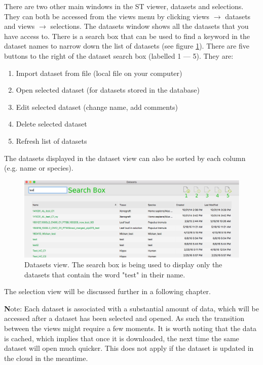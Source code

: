 \documentclass[10pt,a4paper,titlepage]{book}
\begin{document}
There are two other main windows in the ST viewer, datasets and selections. They can both be accessed from the views menu by clicking views $\rightarrow$ datasets and views $\rightarrow$ selections.
The datasets window shows all the datasets that you have access to. There is a search box that can be used to find a keyword in the dataset names to narrow down the list of datasets (see figure \ref{fig:datasets_view}). There are five buttons to the right of the dataset search box (labelled 1 --- 5). They are:
\begin{enumerate}
\item Import dataset from file (local file on your computer)
\item Open selected dataset (for datasets stored in the database)
\item Edit selected dataset (change name, add comments)
\item Delete selected dataset
\item Refresh list of datasets
\end{enumerate}

The datasets displayed in the dataset view can also be sorted by each column (e.g. name or species).
\begin{figure}[h]
	\centering
	\includegraphics[width=0.9\linewidth]{./Pictures/datasets}
	\caption[Datasets view.]{Datasets view. The search box is being used to display only the datasets that contain the word "test" in their name.}
	\label{fig:datasets_view}
\end{figure}

The selection view will be discussed further in {\LARGE a following chapter}.


{ \textbf Note:} 
Each dataset is associated with a substantial amount of data, which will be accessed after a dataset has been selected and opened. As such the transition between the views might require a few moments. It is worth noting that the data is cached, which implies that once it is downloaded, the next time the same dataset will open much quicker. This does not apply if the dataset is updated in the cloud in the meantime.
\end{document}
